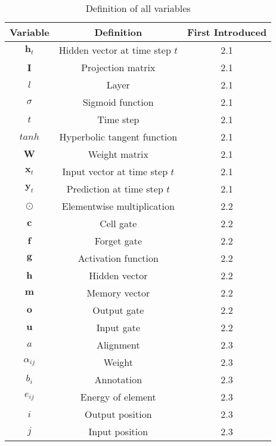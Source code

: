 \documentclass[preprint,12pt,3p]{elsarticle}
\begin{document}
 \begin{table*}[htpb]
 \centering
 \caption{Definition of all variables}
\label{tab:perf_tab}


\begin{adjustbox}{width=0.71 \linewidth}

 \begin{tabularx}{1.55 \textwidth}{|c|C|c|}

       \hline
    Variable & Definition & {First Introduced} \\
    \hline
    $\mathbf h_t$ & Hidden vector at time step $t$ & 2.1 \\
    \hline
    $\mathbf I$   & Projection matrix & 2.1 \\
    \hline
    $l$   & Layer & 2.1 \\
    \hline
    $\sigma$ & Sigmoid function & 2.1 \\
    \hline
    $t$   & Time step & 2.1 \\
    \hline
    $tanh$ & Hyperbolic tangent function & 2.1 \\
    \hline
    $\mathbf W$   & Weight matrix & 2.1 \\
    \hline
    $\mathbf x_t$ & Input vector at time step $t$ & 2.1 \\
    \hline
    $\mathbf y_t$ & Prediction at time step $t$ & 2.1 \\
    \hline
    $\odot$ & Elementwise multiplication & 2.2 \\
    \hline
    $\mathbf c$   & Cell gate & 2.2 \\
    \hline
    $\mathbf f$   & Forget gate & 2.2 \\
    \hline
    $\mathbf g$   & Activation function & 2.2 \\
    \hline
    $\mathbf h$   & Hidden vector & 2.2 \\
    \hline
    $\mathbf m$   & Memory vector & 2.2 \\
    \hline
    $\mathbf o$   & Output gate & 2.2 \\
    \hline
    $\mathbf u$   & Input gate & 2.2 \\
    \hline
    $a$   & Alignment & 2.3 \\
    \hline
    $\alpha_{ij}$ & Weight & 2.3 \\
    \hline
    $b_i$ & Annotation & 2.3 \\
    \hline
    $e_{ij}$ & Energy of element & 2.3 \\
    \hline
    $i$   & Output position & 2.3 \\
    \hline
    $j$   & Input position & 2.3 \\

\end{tabularx}
\end{adjustbox}
\end{table*}
\end{document}
